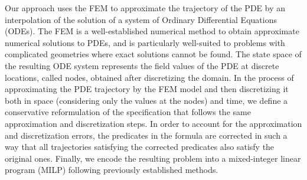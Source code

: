 \documentclass[letterpaper, 10 pt, conference]{ieeeconf/ieeeconf}
\begin{document}

Our approach uses the FEM to
approximate the trajectory of the PDE by an interpolation of the solution of a
system of Ordinary Differential Equations (ODEs). The FEM is a well-established
numerical method to obtain approximate numerical solutions to PDEs, and is particularly
well-suited to problems with complicated
geometries where exact solutions cannot be found. The state space of the
resulting ODE system represents the field values of the PDE at discrete 
locations, called nodes, obtained after discretizing the domain.
In the process of approximating the PDE trajectory by the FEM model and then
discretizing it both in space (considering only the values at the nodes) and time, 
we define a conservative
reformulation of the specification that follows the same approximation and
discretization steps. In order to account for the approximation and
discretization errors, the predicates in the formula are corrected in such a way
that all trajectories satisfying the corrected predicates also satisfy the
original ones. Finally, we encode the resulting problem into a mixed-integer
linear program (MILP) following previously established methods.



\end{document}
